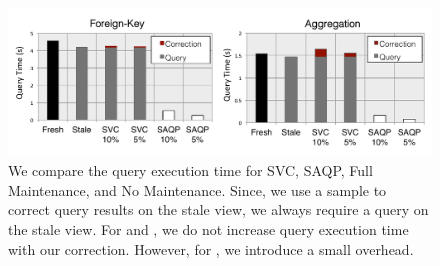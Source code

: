 \begin{figure}[h]
\centering
 \includegraphics[width=\columnwidth]{exp/total_time_agg_view.pdf}
 \caption{We compare the query execution time for SVC, SAQP, Full Maintenance, and No Maintenance. Since, we use a sample to correct query results on the stale view, we always require a query on the stale view. For \fjview and \spview, we do not increase query execution time with our correction. However, for \aggview, we introduce a small overhead.\label{exp10overheads}}
\end{figure}


